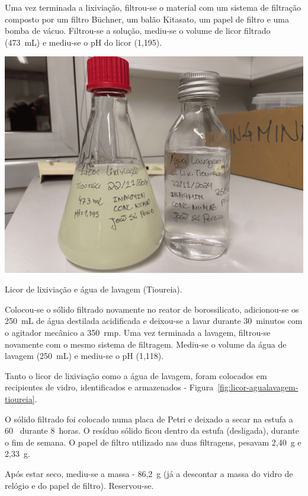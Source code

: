{Uma vez terminada a lixiviação, filtrou-se o material com um sistema de filtração composto por um filtro Büchner, um balão Kitasato, um papel de filtro e uma bomba de vácuo. 
Filtrou-se a solução, mediu-se o volume de licor filtrado (473~mL) e mediu-se o pH do licor (1,195).

\begin{marginfigure}
    \centering
    \includegraphics[width=0.9\linewidth]{figures/Lixiviação Tioureia (Licor e Água de Lavagem).png}
    \caption{Licor de lixiviação e água de lavagem (Tioureia).}
    \label{fig:licor-agualavagem-tioureia}
\end{marginfigure}

Colocou-se o sólido filtrado novamente no reator de borossilicato, adicionou-se os 250~mL de água destilada acidificada e deixou-se a lavar durante 30~minutos com o agitador mecânico a 350~rmp.
Uma vez terminada a lavagem, filtrou-se novamente com o mesmo sistema de filtragem.
Mediu-se o volume da água de lavagem (250~mL) e mediu-se o pH (1,118).

Tanto o licor de lixiviação como a água de lavagem, foram colocados em recipientes de vidro, identificados e armazenados - Figura~\ref{fig:licor-agualavagem-tioureia}.

O sólido filtrado foi colocado numa placa de Petri e deixado a secar na estufa a 60~\graus{} durante 8~horas.
O resíduo sólido ficou dentro da estufa (desligada), durante o fim de semana.
O papel de filtro utilizado nas duas filtragens, pesavam 2,40~g e 2,33~g.

Após estar seco, mediu-se a massa - 86,2~g (já a descontar a massa do vidro de relógio e do papel de filtro). 
Reservou-se.

}

